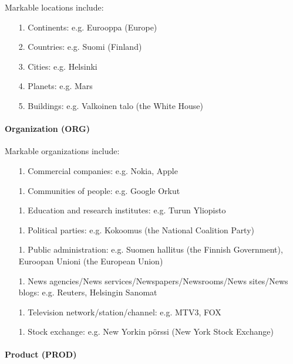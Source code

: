 \documentclass[11pt]{article}
\begin{document}
Markable locations include:

\begin{itemize}

\item[1.] Continents: e.g. Eurooppa (Europe)
\item[2.] Countries: e.g. Suomi (Finland)
\item[3.] Cities: e.g. Helsinki
\item[4.] Planets: e.g. Mars
\item[5.] Buildings: e.g. Valkoinen talo (the White House)

\end{itemize}


\paragraph{Organization (ORG)}

Markable organizations include:

\begin{itemize}

\item[1.] Commercial companies: e.g. Nokia, Apple
\item[1.] Communities of people: e.g. Google Orkut
\item[1.] Education and research institutes: e.g. Turun Yliopisto
\item[1.] Political parties: e.g. Kokoomus (the National Coalition Party)
\item[1.] Public administration: e.g. Suomen hallitus (the Finnish Government), Euroopan Unioni (the European Union) %
\item[1.] News agencies/News services/Newspapers/Newsrooms/News sites/News blogs: e.g. Reuters, Helsingin Sanomat
\item[1.] Television network/station/channel: e.g. MTV3, FOX
\item[1.] Stock exchange: e.g. New Yorkin p\"orssi (New York Stock Exchange)

\end{itemize}


\paragraph{Product (PROD)}
\end{document}
